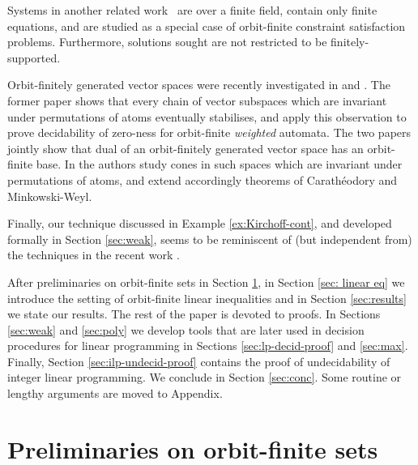 
Systems in another related work~\cite{KKOT15} are over a finite field, contain only 
finite equations, and are studied as a special case of orbit-finite constraint satisfaction problems.
Furthermore, solutions sought are not restricted to be finitely-supported.

Orbit-finitely generated vector spaces were recently investigated in \cite{BKM21} and \cite{GHL22}.
The former paper shows that every chain of vector subspaces which are invariant under permutations of atoms eventually stabilises,
and apply this observation to prove decidability of zero-ness for orbit-finite \emph{weighted} automata.
The two papers jointly show that dual of an orbit-finitely generated vector space has an orbit-finite base.
%
In \cite{MinkowskiWeyl2021} the authors study cones in such spaces which are invariant under permutations of atoms, 
and extend accordingly theorems of Carath\'eodory and Minkowski-Weyl.

Finally, our technique discussed in Example \ref{ex:Kirchoff-cont}, and
developed formally in Section \ref{sec:weak},
seems to be reminiscent of (but independent from) 
the techniques in the recent work \cite{Asia}.





After preliminaries on orbit-finite sets in Section \ref{sec:atoms},
in Section \ref{sec: linear eq} we introduce the setting of orbit-finite linear inequalities and
in Section \ref{sec:results} we state our results.
The rest of the paper is devoted to proofs.
In Sections \ref{sec:weak} and \ref{sec:poly}  we develop tools that are later used in 
decision procedures for linear programming in Sections \ref{sec:lp-decid-proof} and \ref{sec:max}.
Finally, Section \ref{sec:ilp-undecid-proof} contains the proof of undecidability of integer linear programming.
We conclude in Section \ref{sec:conc}.
Some routine or lengthy arguments are moved to Appendix. 


\section{Preliminaries on orbit-finite sets} \label{sec:atoms}

